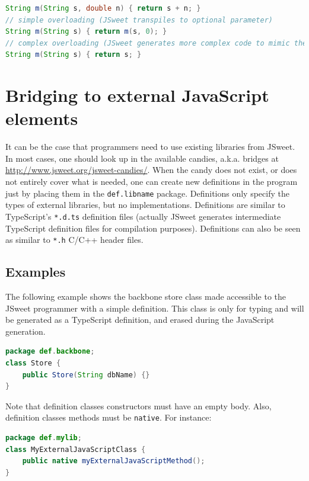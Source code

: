 \documentclass[a4paper]{report}
\begin{document}
\begin{lstlisting}[language=Java]
String m(String s, double n) { return s + n; }
// simple overloading (JSweet transpiles to optional parameter)
String m(String s) { return m(s, 0); }
// complex overloading (JSweet generates more complex code to mimic the Java behavior)
String m(String s) { return s; }
\end{lstlisting}

\chapter{Bridging to external JavaScript elements}

It can be the case that programmers need to use existing libraries from JSweet. In most cases, one should look up in the available candies, a.k.a. bridges at \url{http://www.jsweet.org/jsweet-candies/}. When the candy does not exist, or does not entirely cover what is needed, one can create new definitions in the program just by placing them in the \texttt{def.libname} package. Definitions only specify the types of external libraries, but no implementations. Definitions are similar to TypeScript's \texttt{*.d.ts} definition files (actually JSweet generates intermediate TypeScript definition files for compilation purposes). Definitions can also be seen as similar to \texttt{*.h} C/C++ header files. 

\section{Examples}

The following example shows the backbone store class made accessible to the JSweet programmer with a simple definition. This class is only for typing and will be generated as a TypeScript definition, and erased during the JavaScript generation.

\begin{lstlisting}[language=Java]
package def.backbone;
class Store {
	public Store(String dbName) {}
}
\end{lstlisting}

Note that definition classes constructors must have an empty body. Also, definition classes methods must be \texttt{native}. For instance:

\begin{lstlisting}[language=Java]
package def.mylib;
class MyExternalJavaScriptClass {
	public native myExternalJavaScriptMethod();
}
\end{lstlisting}
\end{document}
